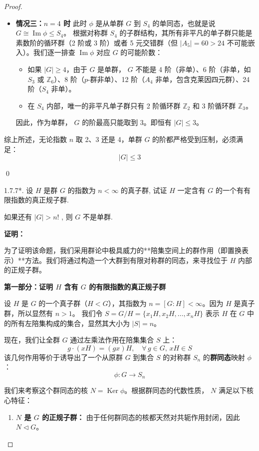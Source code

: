 \documentclass[]{article}
\begin{document}
\begin{proof}
\begin{itemize}
	\item \textbf{情况三：$n = 4$ 时}
	此时 $\phi$ 是从单群 $G$ 到 $S_4$ 的单同态，也就是说 $G \cong \operatorname{Im}\phi \leqslant S_4$。
	根据对称群 $S_4$ 的子群结构，其所有非平凡的单子群只能是素数阶的循环群（2 阶或 3 阶）或者 5 元交错群（但 $|A_5| = 60 > 24$ 不可能嵌入）。我们逐一排查 $\operatorname{Im}\phi$ 对应 $G$ 的可能阶数：
	\begin{itemize}
		\item 如果 $|G| \ge 4$，由于 $G$ 是单群， $G$ 不能是 4 阶（非单）、6 阶（非单，如 $S_3$ 或 $\mathbb{Z}_6$）、8 阶（$p$-群非单）、12 阶（$A_4$ 非单，包含克莱因四元群）、24 阶（$S_4$ 非单）。
		\item 在 $S_4$ 内部，唯一的非平凡单子群只有 2 阶循环群 $\mathbb{Z}_2$ 和 3 阶循环群 $\mathbb{Z}_3$。
	\end{itemize}
	因此，作为单群， $G$ 的阶最高只能取到 3。即恒有 $|G| \leqslant 3$。
\end{itemize}

\bigskip
综上所述，无论指数 $n$ 取 2、3 还是 4，单群 $G$ 的阶都严格受到压制，必须满足：
\[ |G| \leqslant 3 \]

\qed

1.7.7*. 设 $H$ 是群 $G$ 的指数为 $n < \infty$ 的真子群, 试证 $H$ 一定含有 $G$ 的一个有有限指数的真正规子群. 

如果还有 $|G| > n!$ , 则 $G$ 不是单群. 

\bigskip
\noindent \textbf{证明：} 

为了证明该命题，我们采用群论中极具威力的**陪集空间上的群作用（即置换表示）**方法。我们将通过构造一个大群到有限对称群的同态，来寻找位于 $H$ 内部的正规子群。

\bigskip
\noindent \textbf{第一部分：证明 $H$ 含有 $G$ 的有限指数的真正规子群}

设 $H$ 是 $G$ 的一个真子群（$H < G$），其指数为 $n = [G:H] < \infty$。因为 $H$ 是真子群，所以显然有 $n > 1$。
我们令 $S = G/H = \{ x_1H, x_2H, \dots, x_nH \}$ 表示 $H$ 在 $G$ 中的所有左陪集构成的集合，显然其大小为 $|S| = n$。

现在，我们让全群 $G$ 通过左乘法作用在陪集集合 $S$ 上：
\[ g \cdot (xH) = (gx)H, \quad \forall \, g \in G, \, xH \in S \]
该几何作用等价于诱导出了一个从原群 $G$ 到集合 $S$ 的对称群 $S_n$ 的\textbf{群同态}映射 $\phi$：
\[ \phi: G \longrightarrow S_n \]

我们来考察这个群同态的核 $N = \operatorname{Ker}\phi$。根据群同态的代数性质， $N$ 满足以下核心特征：
\begin{enumerate}
	\item \textbf{$N$ 是 $G$ 的正规子群：}
	由于任何群同态的核都天然对共轭作用封闭，因此 $N \triangleleft G$。
	

\end{enumerate}
\end{proof}
\end{document}
